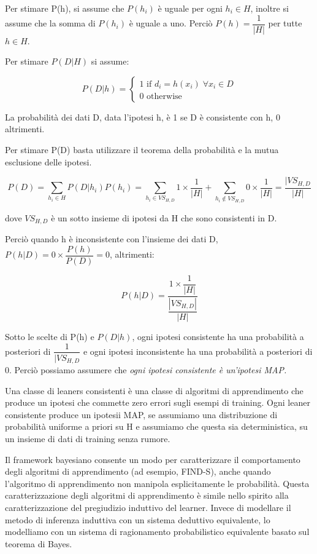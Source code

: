 \documentclass[a4paper]{extarticle}
\begin{document}
Per stimare P(h), si assume che $P(h_i)$ è uguale per ogni $h_i \in H$, inoltre si assume che la somma di $P(h_i)$ è uguale a uno. Perciò $P(h) = \dfrac{1}{|H|}$ per tutte $h\in H$.

Per stimare $P(D|H)$ si assume:

\begin{equation*}
	P(D|h) = 
	\begin{cases}
		1 \text{ if }  d_i = h(x_i) \; \forall x_i \in D \\
		0 \text{ otherwise}
	\end{cases}
\end{equation*}

La probabilità dei dati D, data l'ipotesi h, è 1 se D è consistente con h, 0 altrimenti.

Per stimare P(D) basta utilizzare il teorema della probabilità e la mutua esclusione delle ipotesi.

\begin{equation*}
P(D) = \sum\limits_{h_i \in H} P(D|h_i)P(h_i) = \sum\limits_{h_i \in VS_{H,D}} 1 \times \dfrac{1}{|H|}+ \sum \limits_{h_i \not \in VS_{H,D}} 0\times \dfrac{1}{|H|} = \dfrac{|VS_{H,D}}{|H|}
\end{equation*}

dove $VS_{H,D}$ è un sotto insieme di ipotesi da H che sono consistenti in D.

Perciò quando h è inconsistente con l'insieme dei dati D, $P(h|D) = 0 \times \dfrac{P(h)}{P(D)} = 0$, altrimenti:

\begin{equation*}
P(h|D) = \dfrac{1 \times \dfrac{1}{|H|}}{\dfrac{|VS_{H,D}|}{|H|}}
\end{equation*}

Sotto le scelte di P(h) e $P(D|h)$, ogni ipotesi consistente ha una probabilità a posteriori di $\dfrac{1}{|VS_{H,D}}$ e ogni ipotesi inconsistente ha una probabilità a posteriori di 0. Perciò possiamo assumere che \textit{ogni ipotesi consistente è un'ipotesi MAP.}

Una classe di leaners consistenti è una classe di algoritmi di apprendimento che produce un ipotesi che commette zero errori sugli esempi di training. Ogni leaner consistente produce un ipotesii MAP, se assumiamo una distribuzione di probabilità uniforme a priori su H e assumiamo che questa sia deterministica, su un insieme di dati di training senza rumore.

Il framework bayesiano consente un modo per caratterizzare il comportamento degli algoritmi di apprendimento (ad esempio, FIND-S), anche quando l'algoritmo di apprendimento non manipola esplicitamente le probabilità. Questa caratterizzazione degli algoritmi di apprendimento è simile nello spirito alla caratterizzazione del pregiudizio induttivo del learner. Invece di modellare il metodo di inferenza induttiva con un sistema deduttivo equivalente, lo modelliamo con un sistema di ragionamento probabilistico equivalente basato sul teorema di Bayes.
\end{document}
